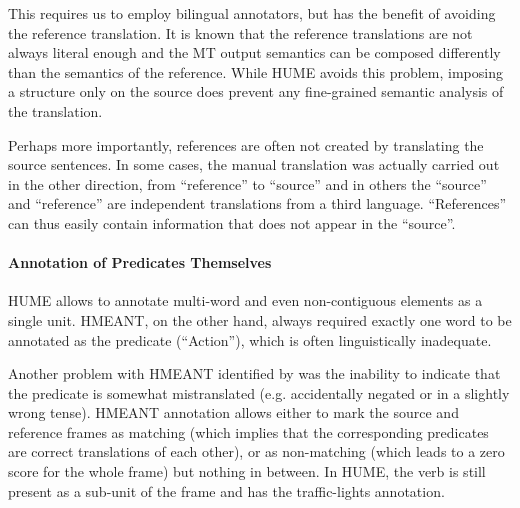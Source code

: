 \documentclass[11pt]{article}
\newcommand{\XXX}[1]{}
\def\perscite#1{\newcite{#1}}
\begin{document}
This requires us to employ bilingual annotators, but has the benefit of avoiding
the reference translation. It is known that the reference translations are not
always literal enough and the MT output semantics can be composed differently
than the semantics of the reference. While HUME avoids this problem,
imposing a structure only on the source does prevent any fine-grained semantic
analysis of the translation.

Perhaps more importantly, references are often not created by translating the source
sentences. In some cases, the manual translation was actually carried out in the
other direction, from ``reference'' to ``source''
and in others the ``source'' and ``reference'' are independent translations
from a third language. ``References'' can thus easily contain information
that does not appear in the ``source''.


\paragraph{Annotation of Predicates Themselves}

HUME allows to annotate multi-word and even
non-contiguous elements as a single unit. HMEANT, on the other hand, always
required exactly one word to be annotated as the predicate (``Action''), which
is often linguistically inadequate.

Another problem with HMEANT identified by \perscite{bojar:wu:ssst:2012} was the
inability to indicate that the predicate is somewhat mistranslated (e.g.
accidentally negated or in a slightly wrong tense). HMEANT
annotation allows either to mark the source and reference frames as matching
(which implies that the corresponding predicates are correct translations of each
other), or as non-matching (which leads to a zero score for the whole frame) but
nothing in between. In HUME, the verb is still present as a sub-unit of the
frame and has the traffic-lights annotation.

\XXX{Omri: I would consider adding further examples from the Google Doc. For instnace
``your risk of falling'' -- ``Ihr Risiko''.
Ondrej: I don't see any HMEANT problem here, the whole NP 'your risk of falling'
is aligned with 'Ihr Risiko' and HMEANT allows to indicate that the match was
partial, to that's probably what everyone would choose. I've put the other
example higher, but please have a look, I'm not sure if we should keep it there
at all.}
  
\end{document}
